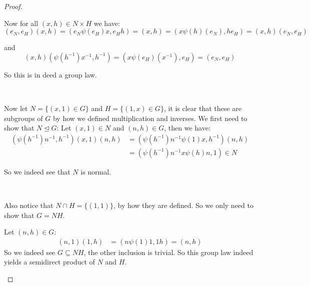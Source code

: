 \begin{exercise}
\begin{proof}
\begin{enumerate}[label = (\alph*)]
Now for all $(x,h)\in N\times H$ we have:\begin{equation*}
(e_N,e_H)(x,h) = (e_N\psi(e_H)x,{e_H}h) = (x,h) = (x\psi(h)(e_N),h{e_H}) = (x,h)(e_N,e_H) 
\end{equation*}

and \begin{equation*}
(x,h)(\psi(h^{-1})x^{-1},h^{-1}) = (x\psi(e_H)(x^{-1}),e_H) = (e_N,e_H)
\end{equation*}

So this is in deed a group law.

\

Now let $N = \{(x,1)\in G\}$ and $H = \{(1,x)\in G\}$, it is clear that these are subgroups of $G$ by how we defined multiplication and inverses.
We first need to show that $N\trianglelefteq G$:
Let $(x,1)\in N$ and $(n,h)\in G$, then we have:\begin{align*}
(\psi(h^{-1})n^{-1},h^{-1})(x,1)(n,h) &= (\psi(h^{-1})n^{-1}\psi(1)x, h^{-1})(n,h)\\
&=  (\psi(h^{-1})n^{-1} x \psi(h)n, 1) \in N
\end{align*}

So we indeed see that $N$ is normal.

\

Also notice that $N\cap H = \{(1,1)\}$, by how they are defined. So we only need to show that $G = NH$.

Let $(n,h)\in G$:\begin{align*}
(n,1)(1,h) &= (n\psi(1)1, 1h) = (n,h)
\end{align*}
So we indeed see $G\subseteq NH$, the other inclusion is trivial. So this group law indeed yields a semidirect product of $N$ and $H$.
\end{enumerate}    
\end{proof}
\end{exercise}

